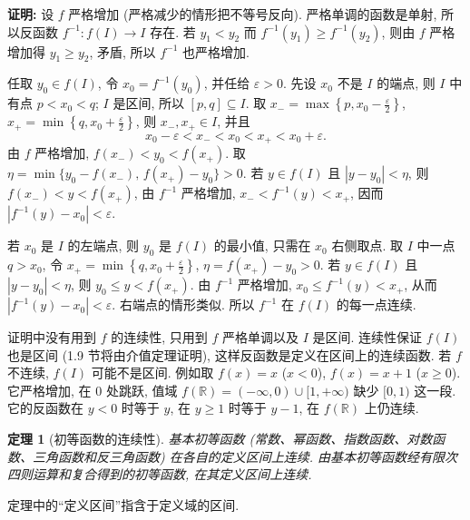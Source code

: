 \documentclass[UTF8,openany]{ctexbook}
\theoremstyle{chinesetextbook}
\newtheorem{theorem}{定理}[section]
\newenvironment{cnproof}{\par\indent\textbf{证明:} \ignorespaces}{\par}
\begin{document}
\begin{cnproof}
设 $f$ 严格增加 (严格减少的情形把不等号反向). 严格单调的函数是单射, 所以反函数 $f^{-1}:f(I)\to I$ 存在. 若 $y_1<y_2$ 而 $f^{-1}(y_1)\ge f^{-1}(y_2)$, 则由 $f$ 严格增加得 $y_1\ge y_2$, 矛盾, 所以 $f^{-1}$ 也严格增加.

任取 $y_0\in f(I)$, 令 $x_0=f^{-1}(y_0)$, 并任给 $\varepsilon>0$. 先设 $x_0$ 不是 $I$ 的端点, 则 $I$ 中有点 $p<x_0<q$; $I$ 是区间, 所以 $[p,q]\subseteq I$. 取 $\displaystyle x_-=\max\left\{p,x_0-\frac\varepsilon2\right\}$, $\displaystyle x_+=\min\left\{q,x_0+\frac\varepsilon2\right\}$, 则 $x_-,x_+\in I$, 并且
\[
x_0-\varepsilon<x_-<x_0<x_+<x_0+\varepsilon.
\]
由 $f$ 严格增加, $f(x_-)<y_0<f(x_+)$. 取 $\eta=\min\{y_0-f(x_-),\,f(x_+)-y_0\}>0$. 若 $y\in f(I)$ 且 $|y-y_0|<\eta$, 则 $f(x_-)<y<f(x_+)$, 由 $f^{-1}$ 严格增加, $x_-<f^{-1}(y)<x_+$, 因而 $|f^{-1}(y)-x_0|<\varepsilon$.

若 $x_0$ 是 $I$ 的左端点, 则 $y_0$ 是 $f(I)$ 的最小值, 只需在 $x_0$ 右侧取点. 取 $I$ 中一点 $q>x_0$, 令 $\displaystyle x_+=\min\left\{q,x_0+\frac\varepsilon2\right\}$, $\eta=f(x_+)-y_0>0$. 若 $y\in f(I)$ 且 $|y-y_0|<\eta$, 则 $y_0\le y<f(x_+)$. 由 $f^{-1}$ 严格增加, $x_0\le f^{-1}(y)<x_+$, 从而 $|f^{-1}(y)-x_0|<\varepsilon$. 右端点的情形类似. 所以 $f^{-1}$ 在 $f(I)$ 的每一点连续.
\end{cnproof}
证明中没有用到 $f$ 的连续性, 只用到 $f$ 严格单调以及 $I$ 是区间. 连续性保证 $f(I)$ 也是区间 (1.9 节将由介值定理证明), 这样反函数是定义在区间上的连续函数. 若 $f$ 不连续, $f(I)$ 可能不是区间. 例如取 $f(x)=x$ ($x<0$), $f(x)=x+1$ ($x\ge0$). 它严格增加, 在 $0$ 处跳跃, 值域 $f(\mathbb R)=(-\infty,0)\cup[1,+\infty)$ 缺少 $[0,1)$ 这一段. 它的反函数在 $y<0$ 时等于 $y$, 在 $y\ge1$ 时等于 $y-1$, 在 $f(\mathbb R)$ 上仍连续.
\begin{theorem}[初等函数的连续性]
基本初等函数 (常数、幂函数、指数函数、对数函数、三角函数和反三角函数) 在各自的定义区间上连续. 由基本初等函数经有限次四则运算和复合得到的初等函数, 在其定义区间上连续.
\end{theorem}
定理中的“定义区间”指含于定义域的区间.
\end{document}
